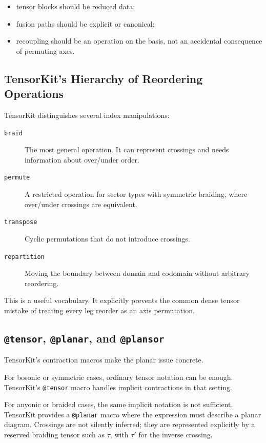 \documentclass[11pt]{article}
\begin{document}
\begin{itemize}[nosep]
  \item tensor blocks should be reduced data;
  \item fusion paths should be explicit or canonical;
  \item recoupling should be an operation on the basis, not an
        accidental consequence of permuting axes.
\end{itemize}

\subsection{TensorKit's Hierarchy of Reordering Operations}

TensorKit distinguishes several index manipulations:

\begin{description}
  \item[\texttt{braid}] The most general operation.  It can represent
        crossings and needs information about over/under order.
  \item[\texttt{permute}] A restricted operation for sector types with
        symmetric braiding, where over/under crossings are equivalent.
  \item[\texttt{transpose}] Cyclic permutations that do not introduce
        crossings.
  \item[\texttt{repartition}] Moving the boundary between domain and
        codomain without arbitrary reordering.
\end{description}

This is a useful vocabulary.  It explicitly prevents the common dense
tensor mistake of treating every leg reorder as an axis permutation.

\subsection{\texttt{@tensor}, \texttt{@planar}, and \texttt{@plansor}}

TensorKit's contraction macros make the planar issue concrete.

For bosonic or symmetric cases, ordinary tensor notation can be enough.
TensorKit's \texttt{@tensor} macro handles implicit contractions in
that setting.

For anyonic or braided cases, the same implicit notation is not
sufficient.  TensorKit provides a \texttt{@planar} macro where the
expression must describe a planar diagram.  Crossings are not silently
inferred; they are represented explicitly by a reserved braiding tensor
such as \(\tau\), with \(\tau'\) for the inverse crossing.
\end{document}
